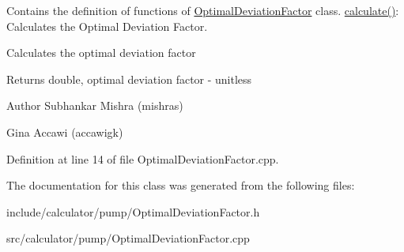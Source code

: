Contains the definition of functions of \hyperlink{class_optimal_deviation_factor}{Optimal\+Deviation\+Factor} class. \hyperlink{class_optimal_deviation_factor_aaa6687bb46d275c4cbcfe44caf895a37}{calculate()}\+: Calculates the Optimal Deviation Factor. 

Calculates the optimal deviation factor

\begin{DoxyReturn}{Returns}
double, optimal deviation factor -\/ unitless
\end{DoxyReturn}
\begin{DoxyAuthor}{Author}
Subhankar Mishra (mishras) 

Gina Accawi (accawigk) 
\end{DoxyAuthor}


Definition at line 14 of file Optimal\+Deviation\+Factor.\+cpp.



The documentation for this class was generated from the following files\+:\begin{DoxyCompactItemize}
\item 
include/calculator/pump/Optimal\+Deviation\+Factor.\+h\item 
src/calculator/pump/Optimal\+Deviation\+Factor.\+cpp\end{DoxyCompactItemize}
